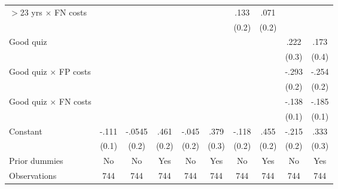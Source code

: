 \begin{table}[htbp]
\begin{tabular}{l*{9}{c}}
$>$23 yrs $\times$ FN costs&                  &                  &                  &                  &                  &     .133         &     .071         &                  &                  \\
                &                  &                  &                  &                  &                  &    (0.2)         &    (0.2)         &                  &                  \\
Good quiz       &                  &                  &                  &                  &                  &                  &                  &     .222         &     .173         \\
                &                  &                  &                  &                  &                  &                  &                  &    (0.3)         &    (0.4)         \\
Good quiz $\times$ FP costs&                  &                  &                  &                  &                  &                  &                  &    -.293         &    -.254         \\
                &                  &                  &                  &                  &                  &                  &                  &    (0.2)         &    (0.2)         \\
Good quiz $\times$ FN costs&                  &                  &                  &                  &                  &                  &                  &    -.138         &    -.185         \\
                &                  &                  &                  &                  &                  &                  &                  &    (0.1)         &    (0.1)         \\
Constant        &    -.111         &   -.0545         &     .461\sym{*}  &    -.045         &     .379         &    -.118         &     .455\sym{**} &    -.215         &     .333         \\
                &    (0.1)         &    (0.2)         &    (0.2)         &    (0.2)         &    (0.3)         &    (0.2)         &    (0.2)         &    (0.2)         &    (0.3)         \\
Prior dummies   &       No         &       No         &      Yes         &       No         &      Yes         &       No         &      Yes         &       No         &      Yes         \\
\hline
Observations    &      744         &      744         &      744         &      744         &      744         &      744         &      744         &      744         &      744         \\

\end{tabular}
\end{table}
